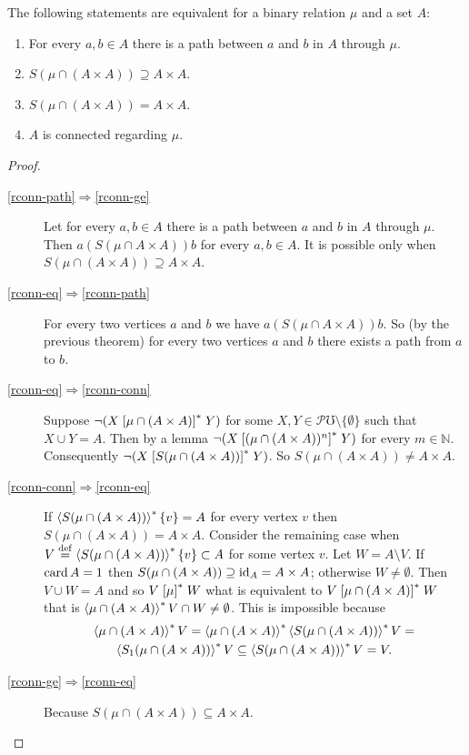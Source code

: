 \begin{thm}
The following statements are equivalent for a binary relation $\mu$
and a set $A$:
\begin{enumerate}
\item \label{rconn-path}For every $a,b\in A$ there is a path between $a$
and $b$ in $A$ through $\mu$.
\item \label{rconn-ge}$S(\mu\cap(A\times A))\supseteq A\times A$.
\item \label{rconn-eq}$S(\mu\cap(A\times A))=A\times A$.
\item \label{rconn-conn}$A$ is connected regarding $\mu$.
\end{enumerate}
\end{thm}
\begin{proof}
~
\begin{description}
\item [{\ref{rconn-path}$\Rightarrow$\ref{rconn-ge}}] Let for every
$a,b\in A$ there is a path between $a$ and $b$ in $A$ through
$\mu$. Then $a\mathrel{(S(\mu\cap A\times A))}b$ for every $a,b\in A$.
It is possible only when $S(\mu\cap(A\times A))\supseteq A\times A$.
\item [{\ref{rconn-eq}$\Rightarrow$\ref{rconn-path}}] For every two
vertices $a$ and $b$ we have $a\mathrel{(S(\mu\cap A\times A))}b$.
So (by the previous theorem) for every two vertices $a$ and $b$
there exists a path from $a$ to $b$.
\item [{\ref{rconn-eq}$\Rightarrow$\ref{rconn-conn}}] Suppose $\lnot(X\mathrel{\left[\mu\cap(A\times A)\right]^{\ast}}Y)$
for some $X,Y\in\mathscr{P}\mho\setminus\{\emptyset\}$ such that
$X\cup Y=A$. Then by a lemma $\lnot(X\mathrel{\left[(\mu\cap(A\times A))^{n}\right]^{\ast}}Y)$
for every $m\in\mathbb{N}$. Consequently $\lnot(X\mathrel{\left[S(\mu\cap(A\times A))\right]^{\ast}}Y)$.
So $S(\mu\cap(A\times A))\ne A\times A$.
\item [{\ref{rconn-conn}$\Rightarrow$\ref{rconn-eq}}] If $\left\langle S(\mu\cap(A\times A))\right\rangle ^{\ast}\{v\}=A$
for every vertex $v$ then $S(\mu\cap(A\times A))=A\times A$. Consider
the remaining case when $V\overset{\mathrm{def}}{=}\left\langle S(\mu\cap(A\times A))\right\rangle ^{\ast}\{v\}\subset A$
for some vertex $v$. Let $W=A\setminus V$. If $\operatorname{card} A=1$ then
$S(\mu\cap(A\times A))\supseteq\operatorname{id}_{A}=A\times A$; otherwise $W\neq\emptyset$.
Then $V\cup W=A$ and so $V\mathrel{\left[\mu\right]^{\ast}}W$ what is equivalent to
$V\mathrel{\left[\mu\cap(A\times A)\right]^{\ast}}W$ that is $\left\langle \mu\cap(A\times A)\right\rangle ^{\ast}V\cap W\ne\emptyset$.
This is impossible because
\begin{multline*}
\left\langle \mu\cap(A\times A)\right\rangle ^{\ast}V=\left\langle \mu\cap(A\times A)\right\rangle ^{\ast}\left\langle S(\mu\cap(A\times A))\right\rangle ^{\ast}V=\\
\left\langle S_{1}(\mu\cap(A\times A))\right\rangle ^{\ast}V\subseteq\left\langle S(\mu\cap(A\times A))\right\rangle ^{\ast}V=V.
\end{multline*}

\item [{\ref{rconn-ge}$\Rightarrow$\ref{rconn-eq}}] Because $S(\mu\cap(A\times A))\subseteq A\times A$.
\end{description}
\end{proof}
